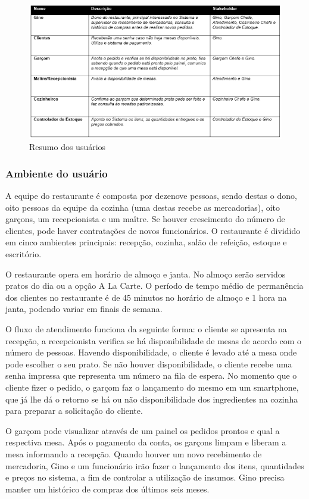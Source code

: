 \begin{figure}[H]
  \centering
  \includegraphics[width=1\textwidth]{softwareengineer/images/users} 
  \caption{Resumo dos usuários}
  \label{fig:users} 
\end{figure}

\subsubsection{Ambiente do usuário}
A equipe do restaurante é composta por dezenove pessoas, sendo destas o dono, oito pessoas da equipe da cozinha (uma destas recebe as mercadorias), oito garçons, um recepcionista e um maître. Se houver crescimento do número de clientes, pode haver contratações de novos funcionários. O restaurante é dividido em cinco ambientes principais: recepção, cozinha, salão de refeição, estoque e escritório.

O restaurante opera em horário de almoço e janta. No almoço serão servidos pratos do dia ou a opção A La Carte. O período de tempo médio de permanência dos clientes no restaurante é de 45 minutos no horário de almoço e 1 hora na janta, podendo variar em finais de semana.

O fluxo de atendimento funciona da seguinte forma: o cliente se apresenta na recepção, a recepcionista verifica se há disponibilidade de mesas de acordo com o número de pessoas. Havendo disponibilidade, o cliente é levado até a mesa onde pode escolher o seu prato. Se não houver disponibilidade, o cliente recebe uma senha impressa que representa um número na fila de espera. No momento que o cliente fizer o pedido, o garçom faz o lançamento do mesmo em um smartphone, que já lhe dá o retorno se há ou não disponibilidade dos ingredientes na cozinha para preparar a solicitação do cliente. 

O garçom pode visualizar através de um painel os pedidos prontos e qual a respectiva mesa. Após o pagamento da conta, os garçons limpam e liberam a mesa informando a recepção.
Quando houver um novo recebimento de mercadoria, Gino e um funcionário irão fazer o lançamento dos itens, quantidades e preços no sistema, a fim de controlar a utilização de insumos. Gino precisa manter um histórico de compras dos últimos seis meses.



